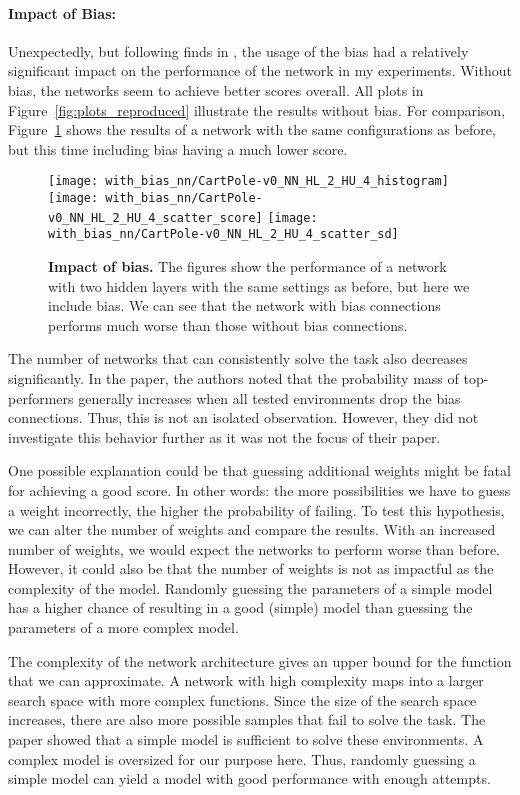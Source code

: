 \paragraph*{Impact of Bias:} Unexpectedly, but following finds in \cite{oller_analyzing_2020}, the usage of the bias had a relatively significant impact on the performance of the network in my experiments. Without bias, the networks seem to achieve better scores overall. All plots in Figure~\ref{fig:plots_reproduced} illustrate the results without bias. For comparison, Figure~\ref{fig:comparison_bias} shows the results of a network with the same configurations as before, but this time including bias having a much lower score.
\begin{figure}[ht]
\centering
\texttt{[image: with\_bias\_nn/CartPole-v0\_NN\_HL\_2\_HU\_4\_histogram]}
\texttt{[image: with\_bias\_nn/CartPole-v0\_NN\_HL\_2\_HU\_4\_scatter\_score]}
\texttt{[image: with\_bias\_nn/CartPole-v0\_NN\_HL\_2\_HU\_4\_scatter\_sd]}
\caption[Impact of bias]{
  \textbf{Impact of bias.}
  The figures show the performance of a network with two hidden layers with the same settings as before, but here we include bias. We can see that the network with bias connections performs much worse than those without bias connections.
}
\label{fig:comparison_bias}
\end{figure}
The number of networks that can consistently solve the task also decreases significantly. In the paper, the authors noted that the probability mass of top-performers generally increases when all tested environments drop the bias connections. Thus, this is not an isolated observation. However, they did not investigate this behavior further as it was not the focus of their paper.

One possible explanation could be that guessing additional weights might be fatal for achieving a good score. In other words: the more possibilities we have to guess a weight incorrectly, the higher the probability of failing. To test this hypothesis, we can alter the number of weights and compare the results. With an increased number of weights, we would expect the networks to perform worse than before. However, it could also be that the number of weights is not as impactful as the complexity of the model. Randomly guessing the parameters of a simple model has a higher chance of resulting in a good (simple) model than guessing the parameters of a more complex model.

The complexity of the network architecture gives an upper bound for the function that we can approximate. A network with high complexity maps into a larger search space with more complex functions. Since the size of the search space increases, there are also more possible samples that fail to solve the task. The paper showed that a simple model is sufficient to solve these environments. A complex model is oversized for our purpose here. Thus, randomly guessing a simple model can yield a model with good performance with enough attempts.

